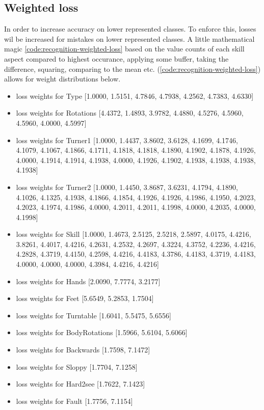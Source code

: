 \subsection{Weighted loss}
\label{results:skill-recognition-weighted-loss}

In order to increase accuracy on lower represented classes. To enforce this, losses wil be increased for mistakes on lower represented classes. A little mathematical magic \ref{code:recognition-weighted-loss} based on the value counts of each skill aspect compared to highest occurance, applying some buffer, taking the difference, squaring, comparing to the mean etc. (\ref{code:recognition-weighted-loss}) allows for weight distributions below.

\begin{itemize}
    \item loss weights for Type [1.0000, 1.5151, 4.7846, 4.7938, 4.2562, 4.7383, 4.6330]
    \item loss weights for Rotations [4.4372, 1.4893, 3.9782, 4.4880, 4.5276, 4.5960, 4.5960, 4.0000, 4.5997]
    \item loss weights for Turner1 [1.0000, 1.4437, 3.8602, 3.6128, 4.1699, 4.1746, 4.1079, 4.1067, 4.1866, 4.1711, 4.1818, 4.1818, 4.1890, 4.1902, 4.1878, 4.1926, 4.0000, 4.1914, 4.1914, 4.1938, 4.0000, 4.1926, 4.1902, 4.1938, 4.1938, 4.1938, 4.1938]
    \item loss weights for Turner2 [1.0000, 1.4450, 3.8687, 3.6231, 4.1794, 4.1890, 4.1026, 4.1325, 4.1938, 4.1866, 4.1854, 4.1926, 4.1926, 4.1986, 4.1950, 4.2023, 4.2023, 4.1974, 4.1986, 4.0000, 4.2011, 4.2011, 4.1998, 4.0000, 4.2035, 4.0000, 4.1998]
    \item loss weights for Skill [1.0000, 1.4673, 2.5125, 2.5218, 2.5897, 4.0175, 4.4216, 3.8261, 4.4017, 4.4216, 4.2631, 4.2532, 4.2697, 4.3224, 4.3752, 4.2236, 4.4216, 4.2828, 4.3719, 4.4150, 4.2598, 4.4216, 4.4183, 4.3786, 4.4183, 4.3719, 4.4183, 4.0000, 4.0000, 4.0000, 4.3984, 4.4216, 4.4216]
    \item loss weights for Hands [2.0090, 7.7774, 3.2177]
    \item loss weights for Feet [5.6549, 5.2853, 1.7504]
    \item loss weights for Turntable [1.6041, 5.5475, 5.6556]
    \item loss weights for BodyRotations [1.5966, 5.6104, 5.6066]
    \item loss weights for Backwards [1.7598, 7.1472]
    \item loss weights for Sloppy [1.7704, 7.1258]
    \item loss weights for Hard2see [1.7622, 7.1423]
    \item loss weights for Fault [1.7756, 7.1154]
\end{itemize}

